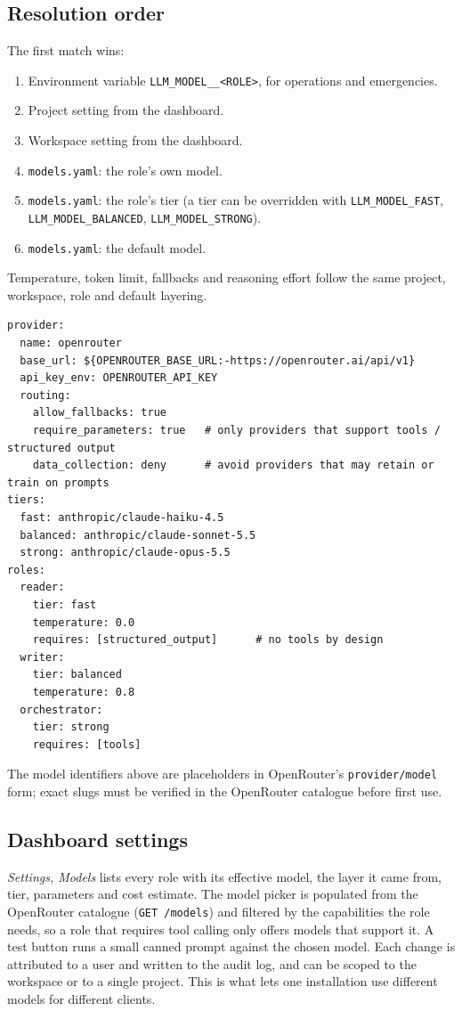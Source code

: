 \documentclass[11pt,a4paper]{article}
\begin{document}
\subsection{Resolution order}
The first match wins:
\begin{enumerate}
  \item Environment variable \texttt{LLM\_MODEL\_\_<ROLE>}, for operations and emergencies.
  \item Project setting from the dashboard.
  \item Workspace setting from the dashboard.
  \item \texttt{models.yaml}: the role's own model.
  \item \texttt{models.yaml}: the role's tier (a tier can be overridden with \texttt{LLM\_MODEL\_FAST}, \texttt{LLM\_MODEL\_BALANCED}, \texttt{LLM\_MODEL\_STRONG}).
  \item \texttt{models.yaml}: the default model.
\end{enumerate}
Temperature, token limit, fallbacks and reasoning effort follow the same project, workspace, role and default layering.

\begin{lstlisting}
provider:
  name: openrouter
  base_url: ${OPENROUTER_BASE_URL:-https://openrouter.ai/api/v1}
  api_key_env: OPENROUTER_API_KEY
  routing:
    allow_fallbacks: true
    require_parameters: true   # only providers that support tools / structured output
    data_collection: deny      # avoid providers that may retain or train on prompts
tiers:
  fast: anthropic/claude-haiku-4.5
  balanced: anthropic/claude-sonnet-5.5
  strong: anthropic/claude-opus-5.5
roles:
  reader:
    tier: fast
    temperature: 0.0
    requires: [structured_output]      # no tools by design
  writer:
    tier: balanced
    temperature: 0.8
  orchestrator:
    tier: strong
    requires: [tools]
\end{lstlisting}

The model identifiers above are placeholders in OpenRouter's \texttt{provider/model} form; exact slugs must be verified in the OpenRouter catalogue before first use.

\subsection{Dashboard settings}
\emph{Settings, Models} lists every role with its effective model, the layer it came from, tier, parameters and cost estimate. The model picker is populated from the OpenRouter catalogue (\texttt{GET /models}) and filtered by the capabilities the role needs, so a role that requires tool calling only offers models that support it. A test button runs a small canned prompt against the chosen model. Each change is attributed to a user and written to the audit log, and can be scoped to the workspace or to a single project. This is what lets one installation use different models for different clients.
\end{document}
